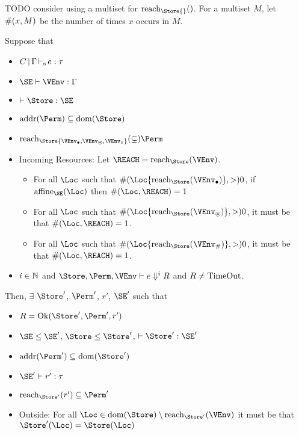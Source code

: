 TODO consider using a multiset for $\Reach\Store{}$. For a multiset
$M$, let $\#(x,M)$ be the number of times $x$ occurs in $M$.
\clearpage{}
\begin{theorem}
  Suppose that
  \begin{itemize}
  \item $C \operatorname{|} \Gamma \operatorname{\vdash_s} e : \tau$
  \item $\SE \vdash \VEnv : \E$
  \item $\vdash \Store : \SE$
  \item $\Addresses\Perm \subseteq \Dom\Store$
  \item $\Reach\Store{\Active\VEnv, \MutableBorrows\VEnv, \ImmutableBorrows\VEnv} \subseteq \Perm$
  \item Incoming Resources: Let $\REACH = \Reach\Store\VEnv$.
    \begin{itemize}
    \item 
      For all $\Loc$ such that $\MultiNumber\Loc{\Reach{\Store}{\Active\VEnv}} >0$,
      if $\Affine{\SE}\Loc$ then $\MultiNumber\Loc\REACH= 1$
    \item For all $\Loc$ such that $
      \MultiNumber\Loc{\Reach{\Store}{\MutableBorrows\VEnv}} >0$, it
      must be that $\MultiNumber\Loc\REACH=1$.
    \item For all $\Loc$ such that $
      \MultiNumber\Loc{\Reach{\Store}{\Suspended\VEnv}} >0$, it
      must be that $\MultiNumber\Loc\REACH=1$.
    \end{itemize}
  \item  $i\in\mathbb{N}$ and $\Store, \Perm, \VEnv \vdash {e}
    \Downarrow^i R$ and $R\ne \operatorname{TimeOut}$.
  \end{itemize}
  Then,
  $\exists$ $\Store'$, $\Perm'$, $r'$, $\SE'$ such that
  \begin{itemize}
  \item
    $R = \Ok{\Store', \Perm', r'}$  
  \item $\SE \le \SE'$, $\Store \le \Store'$,
    $\vdash \Store' : \SE'$ 
  \item $\Addresses{\Perm'} \subseteq \Dom{\Store'}$
  \item $\SE' \vdash r' : \tau$
  \item $\Reach{\Store'}{r'} \subseteq \Perm'$
  \item Outside: For all $\Loc \in \Dom{\Store} \setminus
    \Reach{\Store'}{\VEnv}$ it must be that 
    $\Store' (\Loc) = \Store (\Loc)$

\end{itemize}
\end{theorem}
